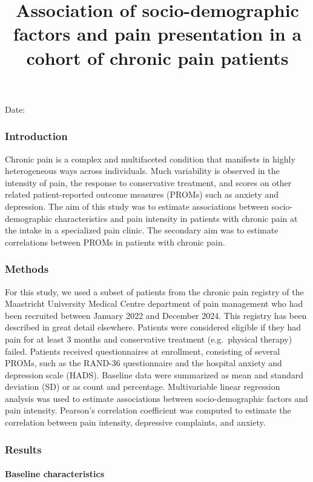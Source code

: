 \documentclass[
]{article}
\title{Association of socio-demographic factors and pain presentation in
a cohort of chronic pain patients}
\author{}
\date{\vspace{-2.5em}}
\begin{document}
\maketitle

Date:

\subsubsection{Introduction}\label{introduction}

Chronic pain is a complex and multifaceted condition that manifests in
highly heterogeneous ways across individuals. Much variability is
observed in the intensity of pain, the response to conservative
treatment, and scores on other related patient-reported outcome measures
(PROMs) such as anxiety and depression. The aim of this study was to
estimate associations between socio-demographic characteristics and pain
intensity in patients with chronic pain at the intake in a specialized
pain clinic. The secondary aim was to estimate correlations between
PROMs in patients with chronic pain.

\subsubsection{Methods}\label{methods}

For this study, we used a subset of patients from the chronic pain
registry of the Maastricht University Medical Centre department of pain
management who had been recruited between January 2022 and December
2024. This registry has been described in great detail elsewhere.
Patients were considered eligible if they had pain for at least 3 months
and conservative treatment (e.g.~physical therapy) failed. Patients
received questionnaires at enrollment, consisting of several PROMs, such
as the RAND-36 questionnaire and the hospital anxiety and depression
scale (HADS). Baseline data were summarized as mean and standard
deviation (SD) or as count and percentage. Multivariable linear
regression analysis was used to estimate associations between
socio-demographic factors and pain intensity. Pearson's correlation
coefficient was computed to estimate the correlation between pain
intensity, depressive complaints, and anxiety.

\subsubsection{Results}\label{results}

\paragraph{Baseline characteristics}\label{baseline-characteristics}
\end{document}

